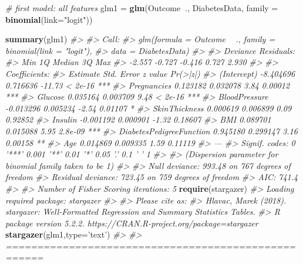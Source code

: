 \documentclass[]{book}
\newenvironment{Shaded}{\begin{snugshade}}{\end{snugshade}}
\newcommand{\CommentTok}[1]{\textcolor[rgb]{0.56,0.35,0.01}{\textit{#1}}}
\newcommand{\DataTypeTok}[1]{\textcolor[rgb]{0.13,0.29,0.53}{#1}}
\newcommand{\KeywordTok}[1]{\textcolor[rgb]{0.13,0.29,0.53}{\textbf{#1}}}
\newcommand{\NormalTok}[1]{#1}
\newcommand{\OperatorTok}[1]{\textcolor[rgb]{0.81,0.36,0.00}{\textbf{#1}}}
\newcommand{\StringTok}[1]{\textcolor[rgb]{0.31,0.60,0.02}{#1}}
\begin{document}
\begin{Shaded}
\begin{Highlighting}[]
\CommentTok{# first model: all features}
\NormalTok{glm1 =}\StringTok{ }\KeywordTok{glm}\NormalTok{(Outcome}\OperatorTok{~}\NormalTok{., }
\NormalTok{           DiabetesData, }
           \DataTypeTok{family =} \KeywordTok{binomial}\NormalTok{(}\DataTypeTok{link=}\StringTok{"logit"}\NormalTok{))}

\KeywordTok{summary}\NormalTok{(glm1)}
\CommentTok{#> }
\CommentTok{#> Call:}
\CommentTok{#> glm(formula = Outcome ~ ., family = binomial(link = "logit"), }
\CommentTok{#>     data = DiabetesData)}
\CommentTok{#> }
\CommentTok{#> Deviance Residuals: }
\CommentTok{#>    Min      1Q  Median      3Q     Max  }
\CommentTok{#> -2.557  -0.727  -0.416   0.727   2.930  }
\CommentTok{#> }
\CommentTok{#> Coefficients:}
\CommentTok{#>                           Estimate Std. Error z value Pr(>|z|)    }
\CommentTok{#> (Intercept)              -8.404696   0.716636  -11.73  < 2e-16 ***}
\CommentTok{#> Pregnancies               0.123182   0.032078    3.84  0.00012 ***}
\CommentTok{#> Glucose                   0.035164   0.003709    9.48  < 2e-16 ***}
\CommentTok{#> BloodPressure            -0.013296   0.005234   -2.54  0.01107 *  }
\CommentTok{#> SkinThickness             0.000619   0.006899    0.09  0.92852    }
\CommentTok{#> Insulin                  -0.001192   0.000901   -1.32  0.18607    }
\CommentTok{#> BMI                       0.089701   0.015088    5.95  2.8e-09 ***}
\CommentTok{#> DiabetesPedigreeFunction  0.945180   0.299147    3.16  0.00158 ** }
\CommentTok{#> Age                       0.014869   0.009335    1.59  0.11119    }
\CommentTok{#> ---}
\CommentTok{#> Signif. codes:  0 '***' 0.001 '**' 0.01 '*' 0.05 '.' 0.1 ' ' 1}
\CommentTok{#> }
\CommentTok{#> (Dispersion parameter for binomial family taken to be 1)}
\CommentTok{#> }
\CommentTok{#>     Null deviance: 993.48  on 767  degrees of freedom}
\CommentTok{#> Residual deviance: 723.45  on 759  degrees of freedom}
\CommentTok{#> AIC: 741.4}
\CommentTok{#> }
\CommentTok{#> Number of Fisher Scoring iterations: 5}
\KeywordTok{require}\NormalTok{(stargazer)}
\CommentTok{#> Loading required package: stargazer}
\CommentTok{#> }
\CommentTok{#> Please cite as:}
\CommentTok{#>  Hlavac, Marek (2018). stargazer: Well-Formatted Regression and Summary Statistics Tables.}
\CommentTok{#>  R package version 5.2.2. https://CRAN.R-project.org/package=stargazer}
\KeywordTok{stargazer}\NormalTok{(glm1,}\DataTypeTok{type=}\StringTok{'text'}\NormalTok{)}
\CommentTok{#> }
\CommentTok{#> ====================================================}

\end{Highlighting}
\end{Shaded}
\end{document}
